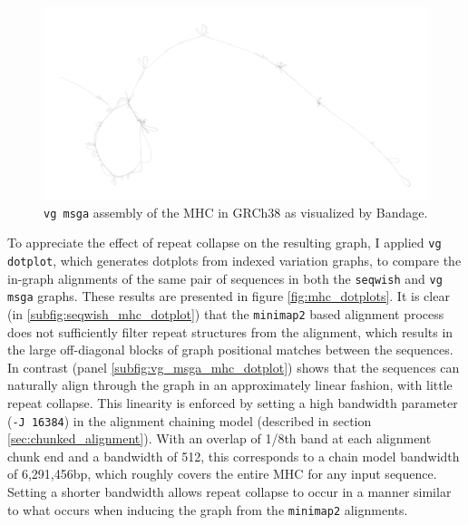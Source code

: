 \begin{figure}[htbp!]
  \includegraphics[width=1.0\textwidth]{Chapter3/Figs/MHC_vg-msga_v1_9_0-115-gc20e80f_gfa.png}
  \caption[{\tt vg msga} assembly of the MHC in GRCh38.]{
    {\tt vg msga} assembly of the MHC in GRCh38 as visualized by Bandage.
  }
  \label{fig:vg_msga_mhc}
\end{figure}

To appreciate the effect of repeat collapse on the resulting graph, I applied {\tt vg dotplot}, which generates dotplots from indexed variation graphs, to compare the in-graph alignments of the same pair of sequences in both the {\tt seqwish} and {\tt vg msga} graphs.
These results are presented in figure \ref{fig:mhc_dotplots}.
It is clear (in \ref{subfig:seqwish_mhc_dotplot}) that the {\tt minimap2} based alignment process does not sufficiently filter repeat structures from the alignment, which results in the large off-diagonal blocks of graph positional matches between the sequences.
In contrast (panel \ref{subfig:vg_msga_mhc_dotplot}) shows that the sequences can naturally align through the graph in an approximately linear fashion, with little repeat collapse.
This linearity is enforced by setting a high bandwidth parameter ({\tt -J 16384}) in the alignment chaining model (described in section \ref{sec:chunked_alignment}).
With an overlap of 1/8th band at each alignment chunk end and a bandwidth of 512, this corresponds to a chain model bandwidth of 6,291,456bp, which roughly covers the entire MHC for any input sequence.
Setting a shorter bandwidth allows repeat collapse to occur in a manner similar to what occurs when inducing the graph from the {\tt minimap2} alignments.

